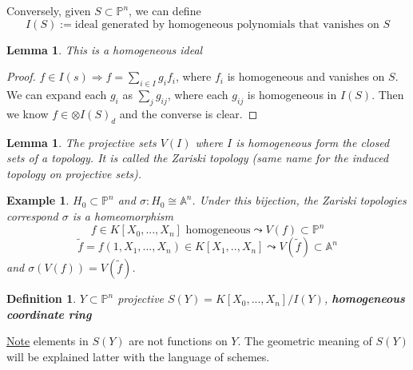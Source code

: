 \documentclass[11pt]{article}
\newtheorem{lemma}[thm]{Lemma}
\newtheorem{dfn}[thm]{Definition}
\newtheorem{ex}[thm]{Example}
\newcommand{\affn}{\mathbb A}
\newcommand{\proj}{\mathbb P}
\newcommand{\Lrta}{\Longrightarrow}
\begin{document}
Conversely, given $S\subset \proj^n$, we can define 
$$
I(S):=\text{ideal generated by homogeneous polynomials that vanishes on $S$}
$$
\begin{lemma}
This is a homogeneous ideal
\end{lemma}
\begin{proof}
$f\in I(s)\Lrta f=\sum_{i\in I}g_i f_i$, where $f_i$ is homogeneous and vanishes on $S$. We can expand each $g_i$ as $\sum_j g_{ij}$, where each $g_{ij}$ is homogeneous in $I(S)$. Then we know $f\in \otimes I(S)_d$ and the converse is clear.
\end{proof}
\begin{lemma}
The projective sets $V(I)$ where $I$ is homogeneous form the closed sets of a topology. It is called the Zariski topology (same name for the induced topology on projective sets).
\end{lemma}
\begin{ex}
$H_0\subset \proj^n$ and $\sigma: H_0\cong \affn^n$. Under this bijection, the Zariski topologies correspond $\sigma $ is a homeomorphism
$$
f\in K[X_0,...,X_n]\text{ homogeneous} \leadsto V(f)\subset \proj^n
$$
$$
\tilde{f}=f(1,X_1,...,X_n)\in K[X_1,..,X_n]\leadsto V(\tilde{f})\subset \affn^n
$$
and $\sigma(V(f))=V(\tilde{f})$.
\end{ex}
\begin{dfn}
$Y\subset \proj^n$ projective $S(Y)=K[X_0,...,X_n]/I(Y)$, \textbf{homogeneous coordinate ring}
\end{dfn}
\underline{Note} elements in $S(Y)$ are not functions on $Y$. The geometric meaning of $S(Y)$ will be explained latter with the language of schemes.
\end{document}
